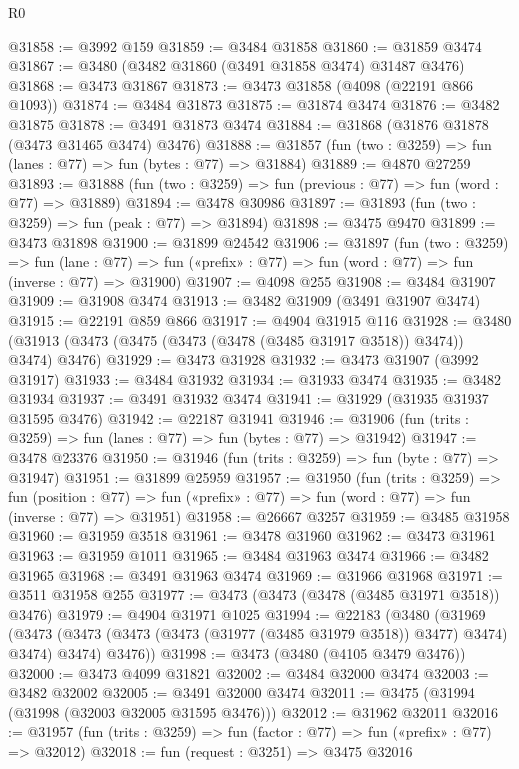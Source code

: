 \begin{lexlean}{R0}
\begin{coremodule}
@31858 := @3992 @159
@31859 := @3484 @31858
@31860 := @31859 @3474
@31867 := @3480 (@3482 @31860 (@3491 @31858 @3474) @31487 @3476)
@31868 := @3473 @31867
@31873 := @3473 @31858 (@4098 (@22191 @866 @1093))
@31874 := @3484 @31873
@31875 := @31874 @3474
@31876 := @3482 @31875
@31878 := @3491 @31873 @3474
@31884 := @31868 (@31876 @31878 (@3473 @31465 @3474) @3476)
@31888 := @31857 (fun (two : @3259) => fun (lanes : @77) => fun (bytes : @77) => @31884)
@31889 := @4870 @27259
@31893 := @31888 (fun (two : @3259) => fun (previous : @77) => fun (word : @77) => @31889)
@31894 := @3478 @30986
@31897 := @31893 (fun (two : @3259) => fun (peak : @77) => @31894)
@31898 := @3475 @9470
@31899 := @3473 @31898
@31900 := @31899 @24542
@31906 := @31897
    (fun (two : @3259) =>
    fun (lane : @77) => fun («prefix» : @77) => fun (word : @77) => fun (inverse : @77) => @31900)
@31907 := @4098 @255
@31908 := @3484 @31907
@31909 := @31908 @3474
@31913 := @3482 @31909 (@3491 @31907 @3474)
@31915 := @22191 @859 @866
@31917 := @4904 @31915 @116
@31928 := @3480 (@31913 (@3473 (@3475 (@3473 (@3478 (@3485 @31917 @3518)) @3474)) @3474) @3476)
@31929 := @3473 @31928
@31932 := @3473 @31907 (@3992 @31917)
@31933 := @3484 @31932
@31934 := @31933 @3474
@31935 := @3482 @31934
@31937 := @3491 @31932 @3474
@31941 := @31929 (@31935 @31937 @31595 @3476)
@31942 := @22187 @31941
@31946 := @31906 (fun (trits : @3259) => fun (lanes : @77) => fun (bytes : @77) => @31942)
@31947 := @3478 @23376
@31950 := @31946 (fun (trits : @3259) => fun (byte : @77) => @31947)
@31951 := @31899 @25959
@31957 := @31950
    (fun (trits : @3259) =>
    fun (position : @77) =>
    fun («prefix» : @77) => fun (word : @77) => fun (inverse : @77) => @31951)
@31958 := @26667 @3257
@31959 := @3485 @31958
@31960 := @31959 @3518
@31961 := @3478 @31960
@31962 := @3473 @31961
@31963 := @31959 @1011
@31965 := @3484 @31963 @3474
@31966 := @3482 @31965
@31968 := @3491 @31963 @3474
@31969 := @31966 @31968
@31971 := @3511 @31958 @255
@31977 := @3473 (@3473 (@3478 (@3485 @31971 @3518)) @3476)
@31979 := @4904 @31971 @1025
@31994 := @22183
    (@3480
      (@31969
        (@3473 (@3473 (@3473 (@3473 (@31977 (@3485 @31979 @3518)) @3477) @3474) @3474) @3474)
        @3476))
@31998 := @3473 (@3480 (@4105 @3479 @3476))
@32000 := @3473 @4099 @31821
@32002 := @3484 @32000 @3474
@32003 := @3482 @32002
@32005 := @3491 @32000 @3474
@32011 := @3475 (@31994 (@31998 (@32003 @32005 @31595 @3476)))
@32012 := @31962 @32011
@32016 := @31957 (fun (trits : @3259) => fun (factor : @77) => fun («prefix» : @77) => @32012)
@32018 := fun (request : @3251) => @3475 @32016

\end{coremodule}
\end{lexlean}
